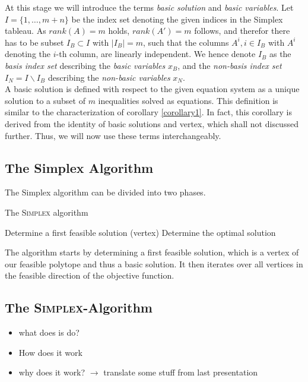 \documentclass[a4paper, 11pt]{article}
\begin{document}
At this stage we will introduce the terms \textit{basic solution} and \textit{basic variables}. Let $I=\{1,\dots,m+n\}$ be the index set denoting the given indices in the Simplex tableau. As $rank(A)=m$ holds, $rank(A')=m$ follows, and therefor there has to be subset $I_B \subset I$ with $|I_B| = m$, such that the columns $A^i, i\in I_B$ with $A^i$ denoting the $i$-th column, are linearly independent. We hence denote $I_B$ as the \textit{basis index set} describing the \textit{basic variables} $x_B$, and the \textit{non-basis index set} $I_N=I\backslash I_B$ describing the \textit{non-basic variables} $x_N$.\\

A basic solution is defined with respect to the given equation system as a unique solution to a subset of $m$ inequalities solved as equations. This definition is similar to the characterization of corollary \ref{corollary1}. In fact, this corollary is derived from the identity of basic solutions and vertex, which shall not discussed further. Thus, we will now use these terms interchangeably. 

\subsection{The Simplex Algorithm}
The Simplex algorithm can be divided into two phases.
\begin{algorithm}[H]
	\caption{The \textsc{Simplex} algorithm}
	\label{alg:seq}
	\begin{algorithmic}[1]
		\STATE Determine a first feasible solution (vertex)
		\STATE Determine the optimal solution
	\end{algorithmic}
\end{algorithm}

The algorithm starts by determining a first feasible solution, which is a vertex of our feasible polytope and thus a basic solution. It then iterates over all vertices in the feasible direction of the objective function.


\subsection{The \textsc{Simplex}-Algorithm}
\begin{itemize}
	\item what does is do?
	\item How does it work
	\item why does it work? $\rightarrow$ translate some stuff from last presentation
\end{itemize}
\end{document}
